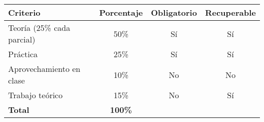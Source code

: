 \documentclass[11pt,a4paper]{article}
\begin{document}
	\begin{center}
		\renewcommand{\arraystretch}{1.4} %
		\begin{tabular}{|l|c|c|c|}
			\hline
			\textbf{Criterio} & \textbf{Porcentaje} & \textbf{Obligatorio} & \textbf{Recuperable} \\
			\hline
			Teoría (25\% cada parcial) & 50\% & Sí & Sí \\
			Práctica & 25\% & Sí & Sí \\
			Aprovechamiento en clase & 10\% & No & No \\
			Trabajo teórico & 15\% & No & Sí \\
			\hline
			\textbf{Total} & \textbf{100\%} & & \\
			\hline
		\end{tabular}
	\end{center}
\end{document}
